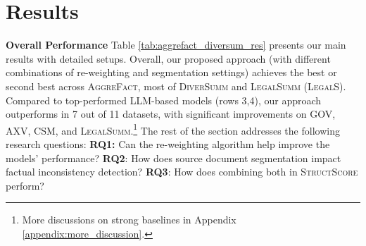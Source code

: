 \section{Results}\label{sec:result}
\textbf{Overall Performance} Table \ref{tab:aggrefact_diversum_res} presents our main results with detailed setups. Overall,  our proposed approach (with different combinations of re-weighting and segmentation settings) achieves the best or second best across \textsc{AggreFact}, most of \textsc{DiverSumm} and \textsc{LegalSumm} (\textsc{LegalS}).
Compared to top-performed LLM-based models (rows 3,4), our approach outperforms in 7 out of 11 datasets, with significant improvements on GOV, AXV, CSM, and \textsc{LegalSumm}.\footnote{More discussions on strong baselines in Appendix \ref{appendix:more_discussion}.}
The rest of the section addresses the following research questions: \textbf{RQ1:} Can the re-weighting algorithm help improve the models' performance?  \textbf{RQ2}: How does source document segmentation impact factual inconsistency detection? \textbf{RQ3}: How does combining both in \textsc{StructScore} perform?
\vspace{-1mm}
